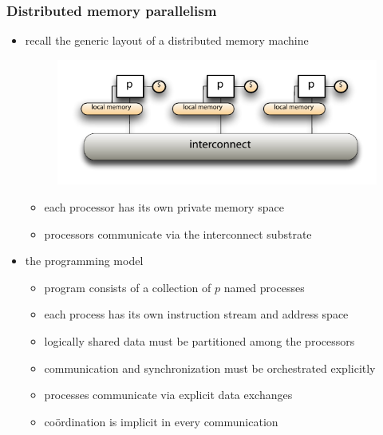 %
%
%
%


\begin{frame}[fragile]
%
  \frametitle{Distributed memory parallelism}
%
  \begin{itemize}
%
  \item recall the generic layout of a distributed memory machine
%
    \begin{figure}
      \centering
      \includegraphics[scale=0.5]{figures/distributed-memory.pdf}
    \end{figure}
    \vspace{-1.0em}
%
    \begin{itemize}
      \item each processor has its own private memory space
      \item processors communicate via the interconnect substrate
    \end{itemize}
%
  \item the programming model
    \begin{itemize}
    \item program consists of a collection of $p$ named processes
      \item each process has its own instruction stream and address space
    \item logically shared data must be partitioned among the processors
    \item communication and synchronization must be orchestrated explicitly 
    \item processes communicate via explicit data exchanges
    \item co\"ordination is implicit in every communication
    \end{itemize}
%
  \end{itemize}
%
\end{frame}

